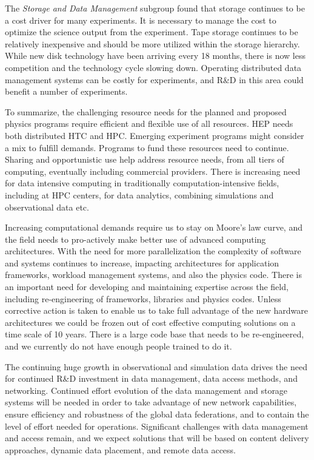 The {\it Storage and Data Management} subgroup found that storage continues
to be a cost driver for many experiments. It is necessary to manage the
cost to optimize the science output from the experiment. Tape storage
continues to be relatively inexpensive and should be more utilized within
the storage hierarchy. While new disk technology have been arriving every
18 months, there is now less competition and the technology cycle slowing
down. Operating distributed data management systems can be costly for
experiments, and R\&D in this area could benefit a number of experiments.

To summarize, the challenging resource needs for the planned and proposed
physics programs require efficient and flexible use of all resources. HEP
needs both distributed HTC and HPC. Emerging experiment programs might
consider a mix to fulfill demands. Programs to fund these resources need to
continue. Sharing and opportunistic use help address resource needs, from
all tiers of computing, eventually including commercial providers. There is
increasing need for data intensive computing in traditionally
computation-intensive fields, including at HPC centers, for data analytics,
combining simulations and observational data etc.

Increasing computational demands require us to stay on Moore’s law curve,
and the field needs to pro-actively make better use of advanced computing
architectures. With the need for more parallelization the complexity of
software and systems continues to increase, impacting architectures for
application frameworks, workload management systems, and also the physics
code. There is an important need for developing and maintaining expertise
across the field, including re-engineering of frameworks, libraries and
physics codes. Unless corrective action is taken to enable us to take full
advantage of the new hardware architectures we could be frozen out of cost
effective computing solutions on a time scale of 10 years. There is a large
code base that needs to be re-engineered, and we currently do not have
enough people trained to do it.

The continuing huge growth in observational and simulation data drives the
need for continued R\&D investment in data management, data access methods,
and networking. Continued effort evolution of the data management and
storage systems will be needed in order to take advantage of new network
capabilities, ensure efficiency and robustness of the global data
federations, and to contain the level of effort needed for operations.
Significant challenges with data management and access remain, and we
expect solutions that will be based on content delivery approaches, dynamic
data placement, and remote data access.

